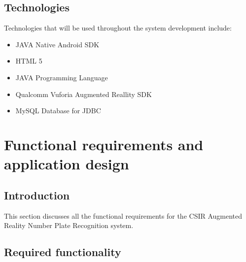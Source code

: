 \documentclass[12pt]{article}
\begin{document}
					\subsection{Technologies}
							Technologies that will be used throughout the system development include:
							\begin{itemize}
								\item JAVA Native Android SDK
								\item HTML 5
								\item JAVA Programming Language
								\item Qualcomm Vuforia Augmented Reallity SDK
								\item MySQL Database for JDBC
							\end{itemize}
                    
                \section{Functional requirements and application design}
                    \subsection{Introduction}
                    This section discusses all the functional requirements for the CSIR Augmented Reality Number Plate Recognition system.
                    
                    \subsection{Required functionality}
\end{document}
